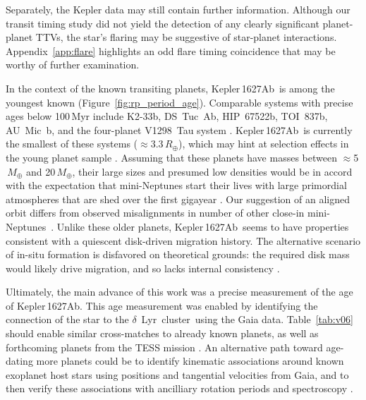 \documentclass[12pt,modern,twocolumn,tighten]{aastex63}
\newcommand{\cn}{$\delta$\ Lyr\ cluster} %
\newcommand{\pn}{Kepler\,1627Ab} %
\begin{document}
Separately, the Kepler data may still contain further information.
Although our transit timing study did not yield the detection of any
clearly significant planet-planet TTVs, the star's flaring may be
suggestive of star-planet interactions.  Appendix~\ref{app:flare}
highlights an odd flare timing coincidence that may be worthy of
further examination.

In the context of the known transiting planets, \pn\ is among the
youngest known (Figure~\ref{fig:rp_period_age}).  Comparable systems
with precise ages below 100\,Myr include K2-33b, DS~Tuc~Ab,
HIP~67522b, TOI~837b, AU~Mic~b, and the four-planet V1298~Tau system
\citep{Mann_K2_33b_2016,David_et_al_2017,newton_tess_2019,david_four_2019,bouma_cluster_2020,plavchan_planet_2020}.
\pn\ is currently the smallest of these systems ($\approx
3.3\,R_\oplus$), which may hint at selection effects in the young
planet sample \citep{zhou_2021_tois}.  Assuming that these planets
have masses between $\approx$5$\,M_\oplus$ and 20$\,M_\oplus$, their
large sizes and presumed low densities would be in accord with the
expectation that mini-Neptunes start their lives with large primordial
atmospheres that are shed over the first gigayear
\citep{Owen_Wu_2013,Fulton_et_al_2017,ginzburg_corepowered_2018}.  Our
suggestion of an aligned orbit differs from observed misalignments in
number of other close-in
mini-Neptunes~\citep{sanchis-ojeda_starspots_2011,albrecht_obliquities_2012,dalal_2019_hd3167,rubenzahl_tess-keck_2021}.
Unlike these older planets, \pn\ seems to have properties
consistent with a quiescent disk-driven migration history.  The
alternative scenario of in-situ formation is disfavored on theoretical
grounds: the required disk mass would likely drive migration, and so
lacks internal consistency
\citep{inamdar_formation_2015,ogihara_reassessment_2015}.

Ultimately, the main advance of this work was a precise measurement of
the age of \pn.   This age measurement was enabled by identifying the
connection of the star to the \cn\ using the Gaia data.  Table~\ref{tab:v06}
should enable similar cross-matches to
already known planets, as well as forthcoming planets from the TESS
mission \citep{ricker_transiting_2015,guerrero_tess_2021}.  An
alternative path toward age-dating more planets could be to identify kinematic associations
around known exoplanet host stars using positions and tangential velocities
from Gaia, and to then verify these associations with ancilliary
rotation periods and spectroscopy \citep[{\it e.g.},][]{tofflemire_tess_2021}.
\end{document}
